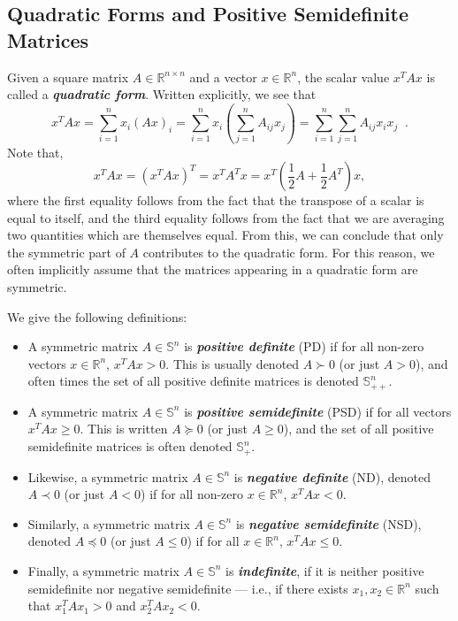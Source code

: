 \documentclass[12pt]{article}
\begin{document}
\subsection{Quadratic Forms and Positive Semidefinite Matrices}
Given a square matrix $A \in \mathbb{R}^{n \times n}$ and a vector $x
\in \mathbb{R}^n$, the scalar value $x^T A x$ is called a
\textbf{\textit{quadratic form}}.  Written explicitly, we see that
\[x^T A x = \sum_{i=1}^n x_i (Ax)_i = \sum_{i=1}^n x_i \left(\sum_{j=1}^n A_{ij} x_j\right) = \sum_{i=1}^n \sum_{j=1}^n A_{ij} x_i x_j\;\;.\]
Note that,
\[x^T A x = (x^T A x)^T = x^T A^T x = x^T\left(\frac{1}{2} A +
\frac{1}{2}A^T\right)x,\]
where the first equality follows from the fact that the transpose
of a scalar is equal to itself, and the third equality follows
from the fact that we are averaging two quantities which are themselves equal.
From this, we can conclude that 
only the symmetric part of $A$ contributes to the quadratic
form.  For this reason, we often implicitly assume that the matrices
appearing in a quadratic form are symmetric.

We give the following definitions:
\begin{itemize}
\item A symmetric matrix $A \in \mathbb{S}^n$ is
\textbf{\textit{positive definite}} (PD) if for all non-zero
vectors $x \in \mathbb{R}^n$, $x^T A x > 0$.  This is usually
denoted $A \succ 0$ (or just $A > 0$), and often times the set of
all positive definite matrices is denoted $\mathbb{S}^n_{++}$. 
  

\item A symmetric matrix $A \in \mathbb{S}^n$ is
\textbf{\textit{positive semidefinite}} (PSD) if for all vectors
$x^T A x \geq 0$.  This is written $A \succeq 0$ (or just $A \geq
0$), and the set of all positive semidefinite matrices is often
denoted $\mathbb{S}^n_+$.

\item Likewise, a symmetric matrix $A \in
\mathbb{S}^n$ is \textbf{\textit{negative definite}} (ND), denoted $A
\prec 0$ (or just $A < 0$) if for all non-zero $x \in
\mathbb{R}^n$, $x^T A x < 0$.

\item Similarly, a symmetric matrix $A \in \mathbb{S}^n$ is
    \textbf{\textit{negative semidefinite}} (NSD), denoted $A \preceq
    0$ (or just $A \leq 0$) if for all $x \in \mathbb{R}^n$, $x^T A x 
\leq 0$.

\item Finally, a symmetric matrix $A \in
\mathbb{S}^n$ is \textbf{\textit{indefinite}}, if it is neither
positive semidefinite nor negative semidefinite --- i.e., if there
exists $x_1, x_2 \in \mathbb{R}^n$ such that $x_1^T A x_1 > 0$ and
$x_2^T A x_2 < 0$.

\end{itemize}
\end{document}
